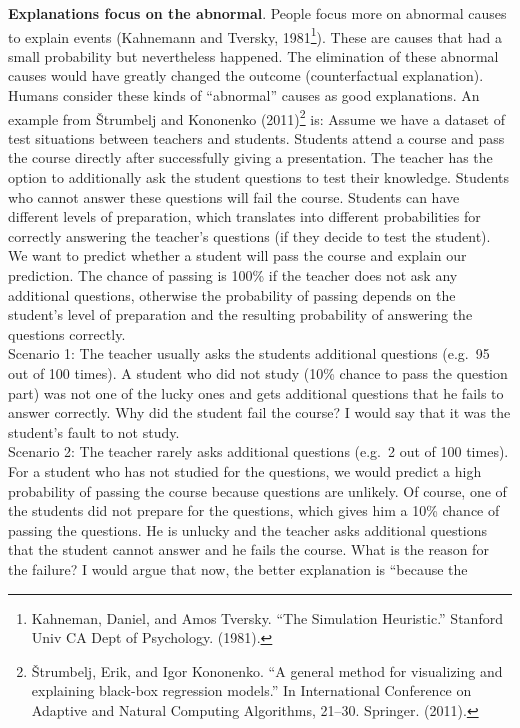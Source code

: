 \documentclass[12pt,]{krantz}
\begin{document}
\textbf{Explanations focus on the abnormal}. People focus more on
abnormal causes to explain events (Kahnemann and Tversky, 1981\footnote{Kahneman,
  Daniel, and Amos Tversky. ``The Simulation Heuristic.'' Stanford Univ
  CA Dept of Psychology. (1981).}). These are causes that had a small
probability but nevertheless happened. The elimination of these abnormal
causes would have greatly changed the outcome (counterfactual
explanation). Humans consider these kinds of ``abnormal'' causes as good
explanations. An example from Štrumbelj and Kononenko (2011)\footnote{Štrumbelj,
  Erik, and Igor Kononenko. ``A general method for visualizing and
  explaining black-box regression models.'' In International Conference
  on Adaptive and Natural Computing Algorithms, 21--30. Springer.
  (2011).} is: Assume we have a dataset of test situations between
teachers and students. Students attend a course and pass the course
directly after successfully giving a presentation. The teacher has the
option to additionally ask the student questions to test their
knowledge. Students who cannot answer these questions will fail the
course. Students can have different levels of preparation, which
translates into different probabilities for correctly answering the
teacher's questions (if they decide to test the student). We want to
predict whether a student will pass the course and explain our
prediction. The chance of passing is 100\% if the teacher does not ask
any additional questions, otherwise the probability of passing depends
on the student's level of preparation and the resulting probability of
answering the questions correctly.\\
Scenario 1: The teacher usually asks the students additional questions
(e.g.~95 out of 100 times). A student who did not study (10\% chance to
pass the question part) was not one of the lucky ones and gets
additional questions that he fails to answer correctly. Why did the
student fail the course? I would say that it was the student's fault to
not study.\\
Scenario 2: The teacher rarely asks additional questions (e.g.~2 out of
100 times). For a student who has not studied for the questions, we
would predict a high probability of passing the course because questions
are unlikely. Of course, one of the students did not prepare for the
questions, which gives him a 10\% chance of passing the questions. He is
unlucky and the teacher asks additional questions that the student
cannot answer and he fails the course. What is the reason for the
failure? I would argue that now, the better explanation is ``because the
\end{document}

